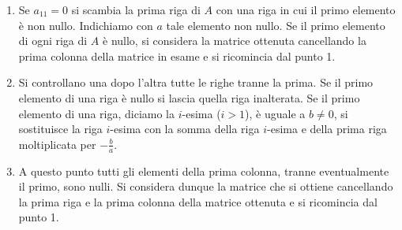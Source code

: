 \documentclass[
  a4paper,
]{article}
\begin{document}
\begin{enumerate}
\def\labelenumi{\arabic{enumi}.}
\item
  Se \(a_{11}=0\) si scambia la prima riga di \(A\) con una riga in cui
  il primo elemento è non nullo. Indichiamo con \(a\) tale elemento non
  nullo. Se il primo elemento di ogni riga di \(A\) è nullo, si
  considera la matrice ottenuta cancellando la prima colonna della
  matrice in esame e si ricomincia dal punto 1.
\item
  Si controllano una dopo l'altra tutte le righe tranne la prima. Se il
  primo elemento di una riga è nullo si lascia quella riga inalterata.
  Se il primo elemento di una riga, diciamo la \(i\)-esima (\(i>1\)), è
  uguale a \(b\neq 0\), si sostituisce la riga \(i\)-esima con la somma
  della riga \(i\)-esima e della prima riga moltiplicata per
  \(-\frac{b}{a}\).
\item
  A questo punto tutti gli elementi della prima colonna, tranne
  eventualmente il primo, sono nulli. Si considera dunque la matrice che
  si ottiene cancellando la prima riga e la prima colonna della matrice
  ottenuta e si ricomincia dal punto 1.
\end{enumerate}
\end{document}
